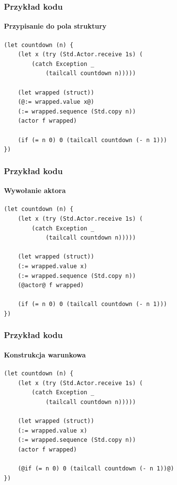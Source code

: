\documentclass[aspectratio=169]{beamer}
\begin{document}
\begin{frame}[fragile]
    \frametitle{Przykład kodu}
    \framesubtitle{Przypisanie do pola struktury}

    \begin{small}
    \begin{lstlisting}
(let countdown (n) {
    (let x (try (Std.Actor.receive 1s) (
        (catch Exception _
            (tailcall countdown n)))))

    (let wrapped (struct))
    (@:= wrapped.value x@)
    (:= wrapped.sequence (Std.copy n))
    (actor f wrapped)

    (if (= n 0) 0 (tailcall countdown (- n 1)))
})
    \end{lstlisting}
    \end{small}
\end{frame}

\begin{frame}[fragile]
    \frametitle{Przykład kodu}
    \framesubtitle{Wywołanie aktora}

    \begin{small}
    \begin{lstlisting}
(let countdown (n) {
    (let x (try (Std.Actor.receive 1s) (
        (catch Exception _
            (tailcall countdown n)))))

    (let wrapped (struct))
    (:= wrapped.value x)
    (:= wrapped.sequence (Std.copy n))
    (@actor@ f wrapped)

    (if (= n 0) 0 (tailcall countdown (- n 1)))
})
    \end{lstlisting}
    \end{small}
\end{frame}

\begin{frame}[fragile]
    \frametitle{Przykład kodu}
    \framesubtitle{Konstrukcja warunkowa}

    \begin{small}
    \begin{lstlisting}
(let countdown (n) {
    (let x (try (Std.Actor.receive 1s) (
        (catch Exception _
            (tailcall countdown n)))))

    (let wrapped (struct))
    (:= wrapped.value x)
    (:= wrapped.sequence (Std.copy n))
    (actor f wrapped)

    (@if (= n 0) 0 (tailcall countdown (- n 1))@)
})
    \end{lstlisting}
    \end{small}
\end{frame}
\end{document}
